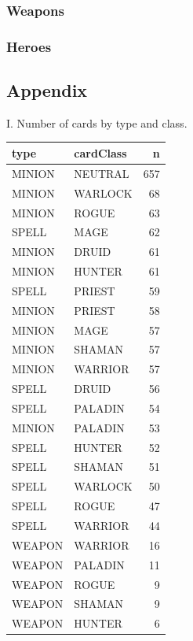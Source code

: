 \documentclass[]{article}
\begin{document}
\subsubsection{Weapons}\label{weapons}

\subsubsection{Heroes}\label{heroes}

\subsection{Appendix}\label{appendix}

I. Number of cards by type and class.

\begin{tabular}{l|l|r}
\hline
type & cardClass & n\\
\hline
MINION & NEUTRAL & 657\\
\hline
MINION & WARLOCK & 68\\
\hline
MINION & ROGUE & 63\\
\hline
SPELL & MAGE & 62\\
\hline
MINION & DRUID & 61\\
\hline
MINION & HUNTER & 61\\
\hline
SPELL & PRIEST & 59\\
\hline
MINION & PRIEST & 58\\
\hline
MINION & MAGE & 57\\
\hline
MINION & SHAMAN & 57\\
\hline
MINION & WARRIOR & 57\\
\hline
SPELL & DRUID & 56\\
\hline
SPELL & PALADIN & 54\\
\hline
MINION & PALADIN & 53\\
\hline
SPELL & HUNTER & 52\\
\hline
SPELL & SHAMAN & 51\\
\hline
SPELL & WARLOCK & 50\\
\hline
SPELL & ROGUE & 47\\
\hline
SPELL & WARRIOR & 44\\
\hline
WEAPON & WARRIOR & 16\\
\hline
WEAPON & PALADIN & 11\\
\hline
WEAPON & ROGUE & 9\\
\hline
WEAPON & SHAMAN & 9\\
\hline
WEAPON & HUNTER & 6\\
\hline

\end{tabular}
\end{document}
